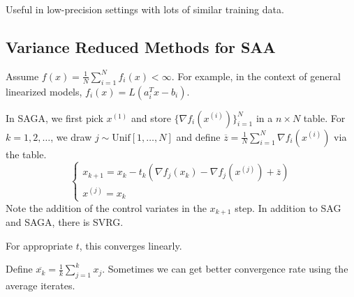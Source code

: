 \documentclass[english, 11pt]{article}
\begin{document}
\begin{rem}
Useful in low-precision settings with lots of similar training data.
\end{rem}


\subsection{Variance Reduced Methods for SAA}
Assume $f(x) = \frac{1}{N} \sum_{i=1}^N f_i(x) < \infty$. For example, in the context of general linearized models, $f_i(x) = L(a_i^T x - b_i)$.

In SAGA, we first pick $x^{(1)}$ and store $\{ \nabla f_i(x^{(i)} ) \}_{i=1}^N$ in a $n \times N$ table. For $k=1,2,\dots$, we draw $j \sim \text{Unif}[1,\dots,N]$ and define $\overline{z} = \frac{1}{N} \sum_{i=1}^N \nabla f_i(x^{(i)})$ via the table.
\[
\begin{cases}
x_{k+1} = x_k - t_k (\nabla f_j(x_k) - \nabla f_j(x^{(j)}) + \overline{z} ) \\
x^{(j)} = x_k
\end{cases}
\]
Note the addition of the control variates in the $x_{k+1}$ step. In addition to SAG and SAGA, there is SVRG.
\begin{thrm}
For appropriate $t$, this converges linearly.
\end{thrm}

\begin{rem}
Define $\overline{x_k} = \frac{1}{k} \sum_{j=1}^k x_j$. Sometimes we can get better convergence rate using the average iterates.
\end{rem}
  
\end{document}
